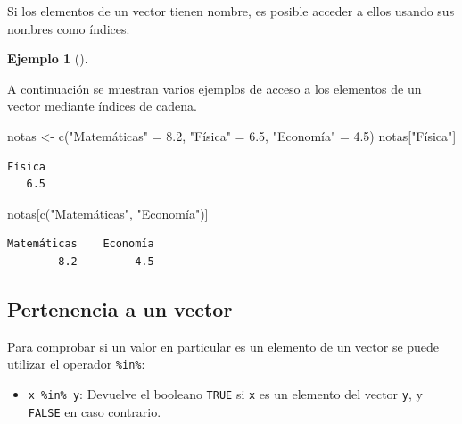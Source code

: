 \documentclass[
  a4paper,
]{scrreport}
\newenvironment{Shaded}{\begin{snugshade}}{\end{snugshade}}
\newcommand{\FloatTok}[1]{\textcolor[rgb]{0.68,0.00,0.00}{#1}}
\newcommand{\FunctionTok}[1]{\textcolor[rgb]{0.28,0.35,0.67}{#1}}
\newcommand{\NormalTok}[1]{\textcolor[rgb]{0.00,0.23,0.31}{#1}}
\newcommand{\OtherTok}[1]{\textcolor[rgb]{0.00,0.23,0.31}{#1}}
\newcommand{\StringTok}[1]{\textcolor[rgb]{0.13,0.47,0.30}{#1}}
\providecommand{\tightlist}{%
  \setlength{\itemsep}{0pt}\setlength{\parskip}{0pt}}\usepackage{longtable,booktabs,array}
\theoremstyle{definition}
\theoremstyle{definition}
\newtheorem{example}{Ejemplo}[chapter]
\theoremstyle{remark}
\begin{document}
Si los elementos de un vector tienen nombre, es posible acceder a ellos
usando sus nombres como índices.

\leavevmode{}%
\begin{example}[]\label{exm-acceso-vector-nombres}

A continuación se muestran varios ejemplos de acceso a los elementos de
un vector mediante índices de cadena.

\begin{Shaded}
\begin{Highlighting}[]
\NormalTok{notas }\OtherTok{\textless{}{-}} \FunctionTok{c}\NormalTok{(}\StringTok{"Matemáticas"} \OtherTok{=} \FloatTok{8.2}\NormalTok{, }\StringTok{"Física"} \OtherTok{=} \FloatTok{6.5}\NormalTok{, }\StringTok{"Economía"} \OtherTok{=} \FloatTok{4.5}\NormalTok{)}
\NormalTok{notas[}\StringTok{"Física"}\NormalTok{]}
\end{Highlighting}
\end{Shaded}

\begin{verbatim}
Física 
   6.5 
\end{verbatim}

\begin{Shaded}
\begin{Highlighting}[]
\NormalTok{notas[}\FunctionTok{c}\NormalTok{(}\StringTok{"Matemáticas"}\NormalTok{, }\StringTok{"Economía"}\NormalTok{)]}
\end{Highlighting}
\end{Shaded}

\begin{verbatim}
Matemáticas    Economía 
        8.2         4.5 
\end{verbatim}

\end{example}

\hypertarget{pertenencia-a-un-vector}{%
\subsection{Pertenencia a un vector}\label{pertenencia-a-un-vector}}

Para comprobar si un valor en particular es un elemento de un vector se
puede utilizar el operador \texttt{\%in\%}:

\begin{itemize}
\tightlist
\item
  \texttt{x\ \%in\%\ y}: Devuelve el booleano \texttt{TRUE} si
  \texttt{x} es un elemento del vector \texttt{y}, y \texttt{FALSE} en
  caso contrario.
\end{itemize}
\end{document}
